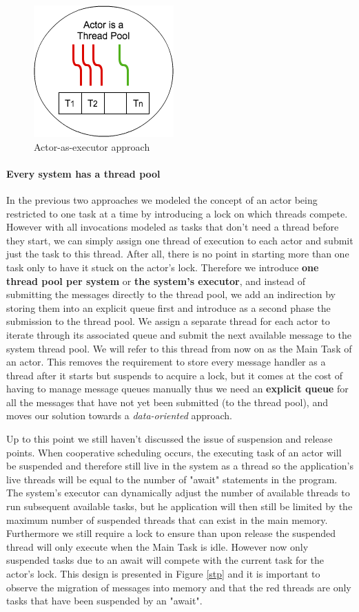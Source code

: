 \begin{figure}
	\centering
	\includegraphics[scale=0.5]{atp.png}
	\caption{Actor-as-executor approach}
	\label{atp}	
\end{figure}

\paragraph{Every system has a thread pool}
In the previous two approaches we modeled the concept of an actor being restricted to one task at a time by introducing a lock on which threads compete.  However with all invocations modeled as tasks that don't need a thread before they start, we can simply assign one thread of execution to each actor and submit just the task to this thread. After all, there is no point in starting more than one task only to have it stuck on the actor's lock. Therefore we introduce \textbf{one thread pool per system} or \textbf{the system's executor}, and instead of submitting the messages directly to the thread pool, we add an indirection by storing them into an explicit queue first and introduce as a second phase the submission to the thread pool. We assign a separate thread for each actor to iterate through its associated queue and submit the next available message to the system thread pool. We will refer to this thread from now on as the Main Task of an actor. This removes the requirement to store every message handler as a thread after it starts but suspends to acquire a lock, but it comes at the cost of having to manage message queues manually thus we need an \textbf{explicit queue} for all the messages that have not yet been submitted (to the thread pool), and moves our solution towards a \textit{data-oriented} approach. 
\par Up to this point we still haven't discussed the issue of suspension and release points. When cooperative scheduling occurs, the executing task of an actor will be suspended and therefore still live in the system as a thread so the application's live threads will be equal to the number of "await" statements in the program. The system's executor can dynamically adjust the number of  available threads to run subsequent available tasks, but he application will then still be limited by the maximum number of suspended threads that can exist in the main memory.  Furthermore we still require a lock to ensure than upon release the suspended thread will only execute when the Main Task is idle. However now only suspended tasks due to an await will compete with the current task for the actor's lock. This design is presented in Figure \ref{stp} and it is important to observe the migration of messages into memory and that the red threads are only tasks that have been suspended by an "await".

